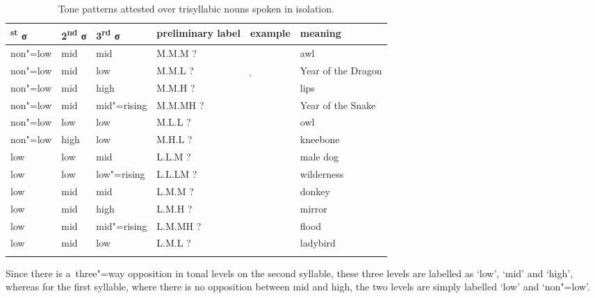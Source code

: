 \begin{table}%
\caption{Tone patterns attested over {trisyllabic} nouns spoken in isolation.}
\begin{tabularx}{\textwidth}{ l l l Q l Q }
  \textsuperscript{st} σ & 2\textsuperscript{nd} σ & 3\textsuperscript{rd} σ & preliminary label & example & meaning\\\midrule
	non"=low & mid & mid & M.M.M ? &  & awl\\
	non"=low & mid & low & M.M.L ? & ̩ & Year of the Dragon\\
	non"=low & mid & high & M.M.H ? &  & lips\\
	non"=low & mid & mid"=rising & M.M.MH ? &  & Year of the Snake\\
	non"=low & low & low & M.L.L ? &  & owl\\
	non"=low & high & low & M.H.L ? &  & kneebone\\
	low & low & mid & L.L.M ? &  & male dog\\
	low & low & low"=rising & L.L.LM ? &  & wilderness\\
	low & mid & mid & L.M.M ? &  & donkey\\
	low & mid & high & L.M.H ? &  & mirror\\
	low & mid & mid"=rising & L.M.MH ? &  & flood\\
	low & mid & low & L.M.L ? &  & ladybird\\
\lspbottomrule
\end{tabularx}
\label{tab:tonepatternsattestedovertrisyllabicnounsspokeninisolation}
\end{table}



Since there is a~three"=way opposition in tonal levels on the second syllable, these three levels are labelled as ‘low’, ‘mid’ and ‘high’, whereas for the first syllable, where there is no opposition between mid and high, the two levels are simply labelled ‘low’ and ‘non"=low’.

